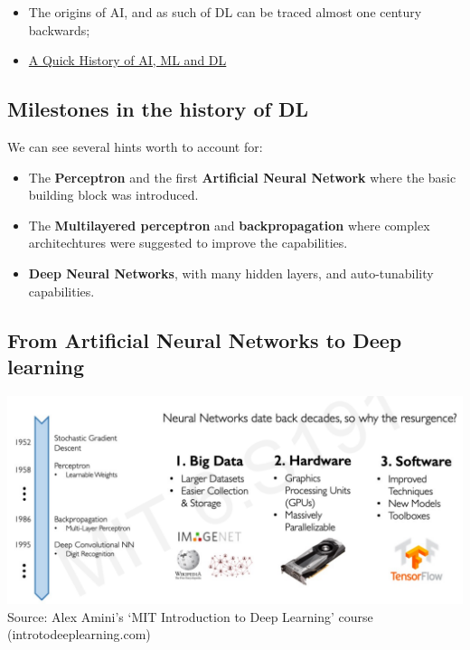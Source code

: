 \documentclass[
  letterpaper,
  DIV=11,
  numbers=noendperiod]{scrartcl}
\providecommand{\tightlist}{%
  \setlength{\itemsep}{0pt}\setlength{\parskip}{0pt}}\usepackage{longtable,booktabs,array}
\begin{document}
\begin{itemize}
\tightlist
\item
  The origins of AI, and as such of DL can be traced almost one century
  backwards;
\item
  \protect\hypertarget{AIHistory}{\href{https://nerdyelectronics.com/a-quick-history-of-ai-ml-and-dl/}{A
  Quick History of AI, ML and DL}}
\end{itemize}

\hypertarget{milestones-in-the-history-of-dl}{%
\subsection{Milestones in the history of
DL}\label{milestones-in-the-history-of-dl}}

We can see several hints worth to account for:

\begin{itemize}
\item
  The \textbf{Perceptron} and the first \textbf{Artificial Neural
  Network} where the basic building block was introduced.
\item
  The \textbf{Multilayered perceptron} and \textbf{backpropagation}
  where complex architechtures were suggested to improve the
  capabilities.
\item
  \textbf{Deep Neural Networks}, with many hidden layers, and
  auto-tunability capabilities.
\end{itemize}

\hypertarget{from-artificial-neural-networks-to-deep-learning}{%
\subsection{From Artificial Neural Networks to Deep
learning}\label{from-artificial-neural-networks-to-deep-learning}}

\includegraphics[width=1\textwidth,height=\textheight]{images/WhyDLNow.png}
Source: Alex Amini's `MIT Introduction to Deep Learning' course
(introtodeeplearning.com)
\end{document}
